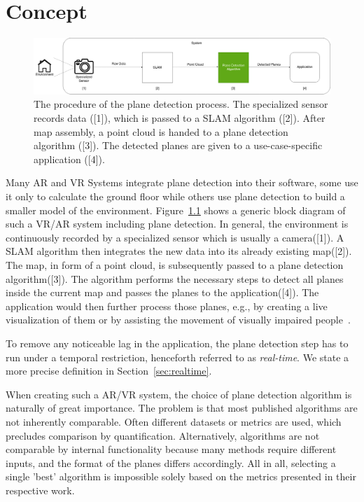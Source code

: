 \documentclass[main.tex]{subfiles}
\begin{document}
\chapter{Concept} \label{chap:Concept}


\begin{figure}[H]
    \centering
    \includegraphics[width=15 cm]{images/concept_specific.png}
    \caption[Concrete Concept Graphic]{The procedure of the plane detection process. The specialized sensor records data ([1]), which is passed to
        a SLAM algorithm ([2]). After map assembly, a point cloud is handed to a plane detection algorithm ([3]).
        The detected planes are given to a use-case-specific application ([4]).}
    \label{fig:concept}
\end{figure}

Many AR and VR Systems integrate plane detection into their software, some use it only to calculate the ground floor while others use plane detection to
build a smaller model of the environment.
Figure~\ref{fig:concept} shows a generic block diagram of such a VR/AR system including plane detection.
In general, the environment is continuously recorded by a specialized sensor which is usually a camera([1]). A SLAM algorithm then integrates the new data into its already existing map([2]). The map, in form of a point cloud,
is subsequently passed to a plane detection algorithm([3]). The algorithm performs the necessary steps to detect all planes inside the current map and passes the planes to the application([4]).
The application would then further process those planes, e.g., by creating a live visualization of them or by assisting the movement of visually impaired people~\cite{Carranza_Estrella_Zaidi_Carranza_2021}.

To remove any noticeable lag in the application, the plane detection step has to run under a temporal restriction, henceforth referred to as \textit{real-time}.
We state a more precise definition in Section~\ref{sec:realtime}.

When creating such a AR/VR system, the choice of plane detection algorithm is naturally of great importance. The problem is that most published algorithms are not inherently comparable.
Often different datasets or metrics are used, which precludes comparison by quantification. Alternatively, algorithms are not comparable by internal functionality
because many methods require different inputs, and the format of the planes differs accordingly. All in all, selecting a single 'best' algorithm is impossible solely based on the metrics presented in their
respective work.
\end{document}
